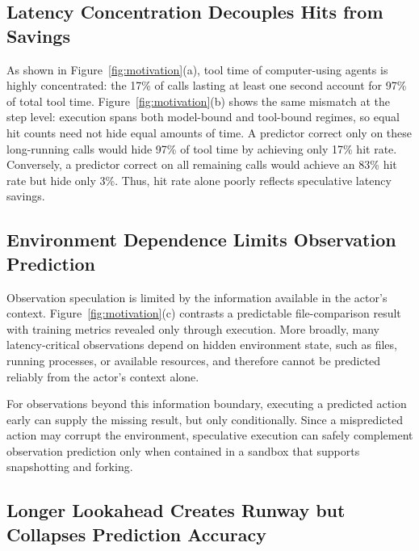 \subsection{Latency Concentration Decouples Hits from Savings}
\label{sec:challenge1}

As shown in Figure~\ref{fig:motivation}(a), tool time of computer-using agents is highly concentrated: the 17\% of calls lasting at least one second account for 97\% of total tool time.
Figure~\ref{fig:motivation}(b) shows the same mismatch at the step level: execution spans both model-bound and tool-bound regimes, so equal hit counts need not hide equal amounts of time.
A predictor correct only on these long-running calls would hide 97\% of tool time by achieving only 17\% hit rate. 
Conversely, a predictor correct on all remaining calls would achieve an 83\% hit rate but hide only 3\%. Thus, hit rate alone poorly reflects speculative latency savings.


\subsection{Environment Dependence Limits Observation Prediction}
\label{sec:challenge2}

Observation speculation is limited by the information available in the
actor's context. Figure~\ref{fig:motivation}(c) contrasts a predictable
file-comparison result with training metrics revealed only through execution.
More broadly, many latency-critical observations depend on hidden environment
state, such as files, running processes, or available resources, and therefore
cannot be predicted reliably from the actor's context alone.

For observations beyond this information boundary, executing a predicted
action early can supply the missing result, but only conditionally. 
Since a mispredicted action may corrupt the environment, speculative execution
can safely complement observation prediction only when contained in a sandbox
that supports snapshotting and forking.


\subsection{Longer Lookahead Creates Runway but Collapses Prediction Accuracy}
\label{sec:challenge3}

